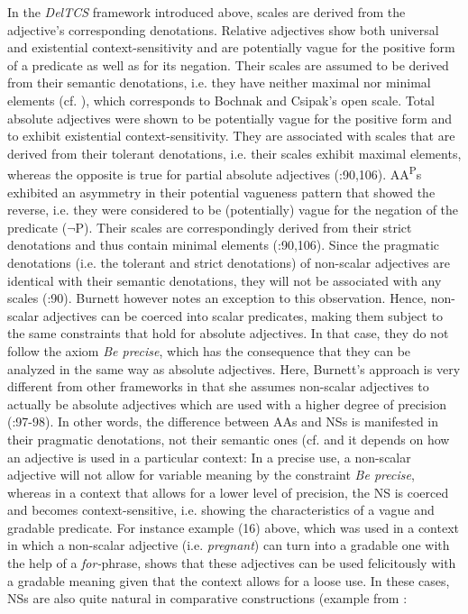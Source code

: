 \documentclass[output=paper
,modfonts
,nonflat]{langsci/langscibook}
\begin{document}
In the \textit{DelTCS} framework introduced above, scales are derived from the adjective's corresponding denotations. Relative adjectives show both universal and existential context-sensitivity and are potentially vague for the positive form of a predicate as well as for its negation. Their scales are assumed to be derived from their semantic denotations, i.e. they have neither maximal nor minimal elements (cf. \textcite[90,107]{Burnett2017}), which corresponds to Bochnak and Csipak's open scale. Total absolute adjectives were shown to be potentially vague for the positive form and to exhibit existential context-sensitivity. They are associated with scales that are derived from their tolerant denotations, i.e. their scales exhibit maximal elements, whereas the opposite is true for partial absolute adjectives (\citeyear{Burnett2017}:90,106). AA\textsuperscript{P}s exhibited an asymmetry in their potential vagueness pattern that showed the reverse, i.e. they were considered to be (potentially) vague for the negation of the predicate ($\neg$P). Their scales are correspondingly derived from their strict denotations and thus contain minimal elements (\citeyear{Burnett2017}:90,106). Since the pragmatic denotations (i.e. the tolerant and strict denotations) of non-scalar adjectives are identical with their semantic denotations, they will not be associated with any scales (\citeyear{Burnett2017}:90). Burnett however notes an exception to this observation. Hence, non-scalar adjectives can be coerced into scalar predicates, making them subject to the same constraints that hold for absolute adjectives. In that case, they do not follow the axiom \textit{Be precise}, which has the consequence that they can be analyzed in the same way as absolute adjectives. Here, Burnett's approach is very different from other frameworks in that she assumes non-scalar adjectives to actually be absolute adjectives which are used with a higher degree of precision (\citeyear{Burnett2017}:97-98). In other words, the difference between AAs and NSs is manifested in their pragmatic denotations, not their semantic ones (cf. \textcite[98]{Burnett2017} and it depends on how an adjective is used in a particular context: In a precise use, a non-scalar adjective will not allow for variable meaning by the constraint \textit{Be precise}, whereas in a context that allows for a lower level of precision, the NS is coerced and becomes context-sensitive, i.e. showing the characteristics of a vague and gradable predicate. For instance example (16) above, which was used in a context in which a non-scalar adjective (i.e. \textit{pregnant}) can turn into a gradable one with the help of a \textit{for-}phrase, shows that these adjectives can be used felicitously with a gradable meaning given that the context allows for a loose use. In these cases, NSs are also quite natural in comparative constructions (example from \textcite[96]{Burnett2017}:
\end{document}
